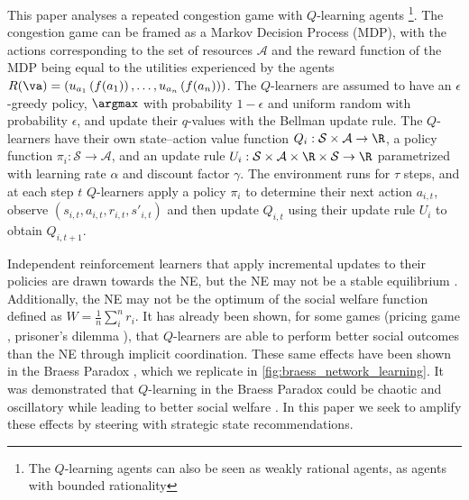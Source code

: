 This paper analyses a repeated congestion game with $Q$-learning agents \footnote{The $Q$-learning agents can also be seen as weakly rational agents, as agents with bounded rationality}. The congestion game can be framed as a Markov Decision Process (MDP), with the actions corresponding to the set of resources $\mathcal{A}$ and the reward function of the MDP being equal to the utilities experienced by the agents $R(\va) = \left(u_{a_1}\left(f(a_1)\right), \dots, u_{a_n}\left(f(a_n)\right)\right)$. The $Q$-learners are assumed to have an $\epsilon$-greedy policy, $\argmax$ with probability $1-\epsilon$ and uniform random with probability $\epsilon$, and update their $q$-values with the Bellman update rule. The $Q$-learners have their own state--action value function $Q_{i}: \mathcal{S} \times \mathcal{A} \rightarrow \R$, a policy function $\pi_i: \mathcal{S} \rightarrow \mathcal{A}$, and an update rule $U_i: \mathcal{S} \times \mathcal{A} \times \R \times \mathcal{S} \rightarrow \R$ parametrized with learning rate $\alpha$ and discount factor $\gamma$. The environment runs for $\tau$ steps, and at each step $t$ $Q$-learners apply a policy $\pi_i$ to determine their next action $a_{i,t}$, observe $(s_{i,t}, a_{i,t}, r_{i,t}, s'_{i,t})$ and then update $Q_{i,t}$ using their update rule $U_i$ to obtain $Q_{i,t+1}$.

Independent reinforcement learners that apply incremental updates to their policies are drawn towards the NE, but the NE may not be a stable equilibrium \cite{kleinberg2011beyond, bielawski2021follow, bielawski2022route}. Additionally, the NE may not be the optimum of the social welfare function defined as $W=\frac{1}{n}\sum_{i}^n r_i$. It has already been shown, for some games (pricing game \cite{calvano2020artificial, klein2021autonomous}, prisoner's dilemma \cite{schaefer2022emergence, dolgopolov2022reinforcement}), that $Q$-learners are able to perform better social outcomes than the NE through implicit coordination. These same effects have been shown in the Braess Paradox \cite{carissimo2024counter}, which we replicate in \autoref{fig:braess_network_learning}. It was demonstrated that $Q$-learning in the Braess Paradox could be chaotic and oscillatory while leading to better social welfare \cite{carissimo2024counter}. In this paper we seek to amplify these effects by steering with strategic state recommendations.

